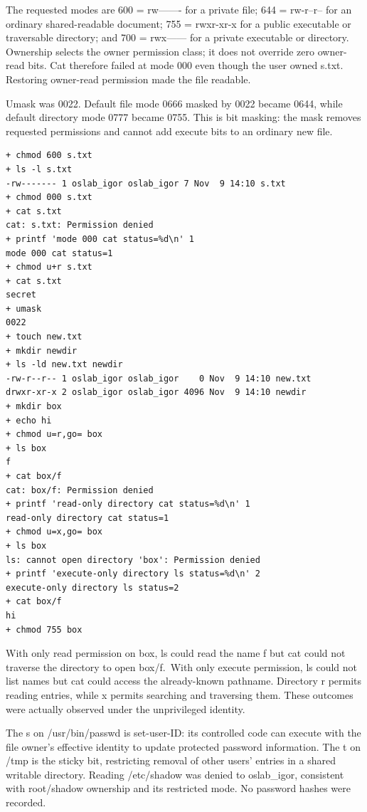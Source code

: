 \documentclass[12pt,a4paper]{article}
\begin{document}
The requested modes are 600 =
{\ttfamily\fontsize{10}{12}\selectfont rw-------} for a private file;
644 = {\ttfamily\fontsize{10}{12}\selectfont rw-r--r--} for an ordinary
shared-readable document; 755 =
{\ttfamily\fontsize{10}{12}\selectfont rwxr-xr-x} for a public
executable or traversable directory; and 700 =
{\ttfamily\fontsize{10}{12}\selectfont rwx------} for a private
executable or directory. Ownership selects the owner permission class;
it does not override zero owner-read bits. Cat therefore failed at mode
000 even though the user owned s.txt. Restoring owner-read permission
made the file readable.

Umask was 0022. Default file mode 0666 masked by 0022 became 0644, while
default directory mode 0777 became 0755. This is bit masking: the mask
removes requested permissions and cannot add execute bits to an ordinary
new file.

\begin{lstlisting}
+ chmod 600 s.txt
+ ls -l s.txt
-rw------- 1 oslab_igor oslab_igor 7 Nov  9 14:10 s.txt
+ chmod 000 s.txt
+ cat s.txt
cat: s.txt: Permission denied
+ printf 'mode 000 cat status=%d\n' 1
mode 000 cat status=1
+ chmod u+r s.txt
+ cat s.txt
secret
+ umask
0022
+ touch new.txt
+ mkdir newdir
+ ls -ld new.txt newdir
-rw-r--r-- 1 oslab_igor oslab_igor    0 Nov  9 14:10 new.txt
drwxr-xr-x 2 oslab_igor oslab_igor 4096 Nov  9 14:10 newdir
+ mkdir box
+ echo hi
+ chmod u=r,go= box
+ ls box
f
+ cat box/f
cat: box/f: Permission denied
+ printf 'read-only directory cat status=%d\n' 1
read-only directory cat status=1
+ chmod u=x,go= box
+ ls box
ls: cannot open directory 'box': Permission denied
+ printf 'execute-only directory ls status=%d\n' 2
execute-only directory ls status=2
+ cat box/f
hi
+ chmod 755 box
\end{lstlisting}

With only read permission on box, ls could read the name f but cat could
not traverse the directory to open box/f.~With only execute permission,
ls could not list names but cat could access the already-known pathname.
Directory r permits reading entries, while x permits searching and
traversing them. These outcomes were actually observed under the
unprivileged identity.

The s on
{\ttfamily\fontsize{10}{12}\selectfont /usr/bin/pas\allowbreak{}swd} is
set-user-ID: its controlled code can execute with the file owner's
effective identity to update protected password information. The t on
{\ttfamily\fontsize{10}{12}\selectfont /tmp} is the sticky bit,
restricting removal of other users' entries in a shared writable
directory. Reading {\ttfamily\fontsize{10}{12}\selectfont /etc/shadow}
was denied to oslab\_igor, consistent with root/shadow ownership and its
restricted mode. No password hashes were recorded.
\end{document}
